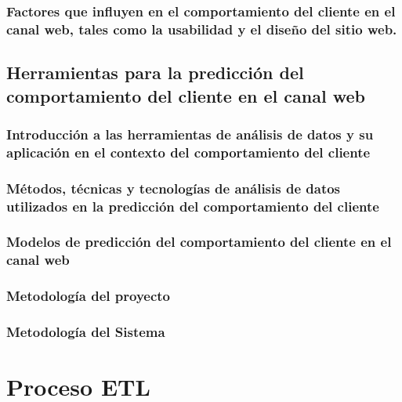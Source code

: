 \documentclass{report}
\begin{document}
\subsection{Factores que influyen en el comportamiento del cliente en el canal web, tales como la usabilidad y el diseño del sitio web.}


\section{Herramientas para la predicción del comportamiento del cliente en el canal web}

\subsection{Introducción a las herramientas de análisis de datos y su aplicación en el contexto del comportamiento del cliente}


\subsection{Métodos, técnicas y tecnologías de análisis de datos utilizados en la predicción del comportamiento del cliente}


\subsection{Modelos de predicción del comportamiento del cliente en el canal web}


\subsection{Metodología del proyecto}


\subsection{Metodología del Sistema}


\chapter{Proceso ETL}
\newpage
\end{document}
